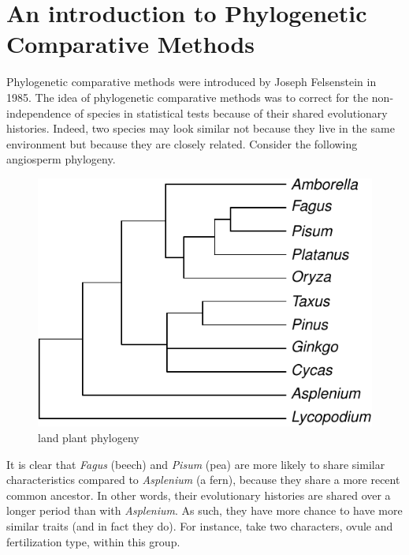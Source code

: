 \documentclass[
]{book}
\begin{document}
\hypertarget{intro}{%
\chapter{An introduction to Phylogenetic Comparative Methods}\label{intro}}

Phylogenetic comparative methods were introduced by Joseph Felsenstein in 1985. The idea of phylogenetic comparative methods was to correct for the non-independence of species in statistical tests because of their shared evolutionary histories. Indeed, two species may look similar not because they live in the same environment but because they are closely related. Consider the following angiosperm phylogeny.

\begin{figure}

{\centering \includegraphics{pcm-workshop_files/figure-latex/AngiospermTree-1} 

}

\caption{land plant phylogeny}\label{fig:AngiospermTree}
\end{figure}

It is clear that \emph{Fagus} (beech) and \emph{Pisum} (pea) are more likely to share similar characteristics compared to \emph{Asplenium} (a fern), because they share a more recent common ancestor. In other words, their evolutionary histories are shared over a longer period than with \emph{Asplenium}. As such, they have more chance to have more similar traits (and in fact they do). For instance, take two characters, ovule and fertilization type, within this group.
\end{document}
